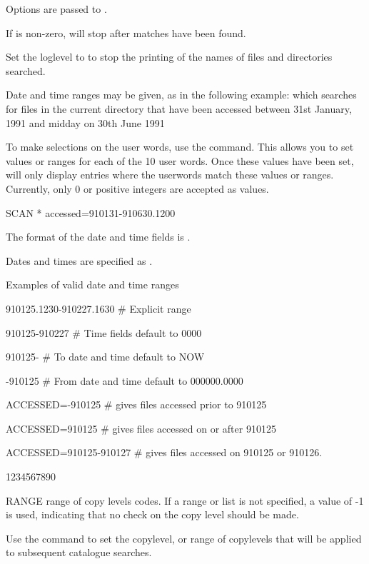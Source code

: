 Options are passed to .

If  is non-zero,  will stop after 
 matches have been found.

Set the loglevel to  to stop the printing of the names of
files and directories searched.

Date and time ranges may be given, as in the following example:
which searches for files in the current directory that have been
accessed between 31st January, 1991 and midday on 30th June 1991

To make selections on the user words, use the  command.
This allows you to set values or ranges for each of the 10 user words.
Once these values have been set,  will only display entries
where the userwords match these values or ranges.
Currently, only 0 or positive integers are accepted as values.
\begin{XMP}
SCAN * accessed=910131-910630.1200
\end{XMP}
The format of the date and time fields is 
.

Dates and times are specified as .
 
\begin{XMPt}{Examples of valid date and time ranges}

910125.1230-910227.1630   # Explicit range

910125-910227             # Time fields default to 0000

910125-                   # To date and time default to NOW

-910125                   # From date and time default to 000000.0000


ACCESSED=-910125          # gives files accessed prior to 910125

ACCESSED=910125           # gives files accessed on or after 910125 

ACCESSED=910125-910127    # gives files accessed on 910125 or 910126.
\end{XMPt}

\begin{DLtt}{1234567890}
\item[RANGE]range of copy levels codes. If a range or list is not specified,
a value of -1 is used, indicating that no check on the copy level
should be made.
\end{DLtt}
Use the  command to set the copylevel, or range of copylevels
that will be applied to subsequent catalogue searches.

